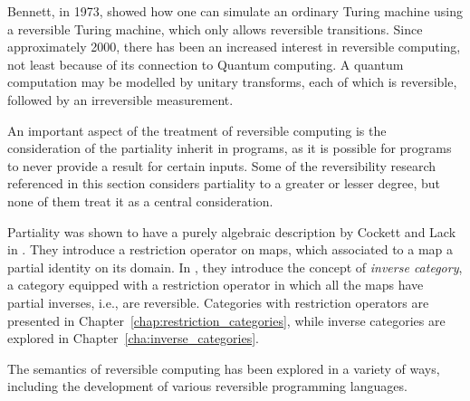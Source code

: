 Bennett, in 1973,  \cite{bennett:1973reverse} showed how one can simulate an ordinary Turing machine
using a reversible Turing machine, which only allows reversible transitions. Since approximately 2000, there has
been an increased interest in reversible computing, not least because of its connection to Quantum
computing. A quantum computation may be modelled by unitary
transforms\cite{neilsen2000:QuantumComputationAndInfo}, each of which is reversible, followed by an
irreversible measurement.

An important aspect of the treatment of reversible computing is the consideration of the partiality
inherit in programs, as it is possible for programs to never provide a result for certain
inputs. Some of the reversibility research referenced in this section considers partiality to a
greater or lesser degree, but none of them treat it as a central consideration.

Partiality was shown to have a purely algebraic description by Cockett and Lack in
\cite{cockett2002:restcategories1,cockettlack2003:restcategories2,cockettlack2004:restcategories3}. They
introduce a restriction  operator on maps, which associated to a map a partial identity on its
domain. In \cite{cockett2002:restcategories1}, they introduce the concept of \emph{inverse
  category}, a category equipped with a restriction operator in which all the maps have partial
inverses, i.e., are reversible. Categories with restriction operators are presented in
Chapter~\ref{chap:restriction_categories}, while inverse categories are explored in
Chapter~\ref{cha:inverse_categories}.

The semantics of reversible computing has been explored in a variety of ways, including the
development of various reversible programming languages.


